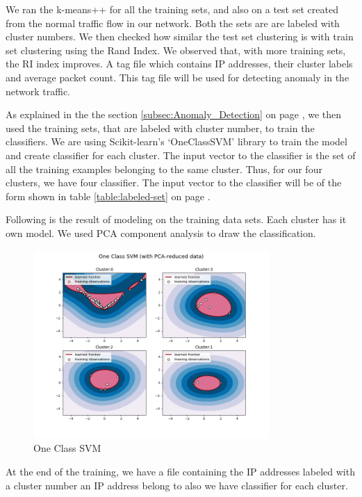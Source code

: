 \documentclass[12pt,oneside,a4paper]{article}
\begin{document}
We ran the k-means++ for all the training sets, and also on a test set created from the normal traffic flow in our network. Both the sets are are labeled with cluster numbers. We then checked how similar the test set clustering is with train set clustering using the Rand Index. We observed that, with more training sets, the RI index improves. A tag file which contains IP addresses, their cluster labels and average packet count. This tag file will be used for detecting anomaly in the network traffic.

As explained in the the section \ref{subsec:Anomaly_Detection} on page \pageref{subsec:Anomaly_Detection}, we then used the training sets, that are labeled with cluster number, to train the classifiers. We are using Scikit-learn's `OneClassSVM' library to train the model and create classifier for each cluster. The input vector to the classifier is the set of all the training examples belonging to the same cluster. Thus, for our four clusters, we have four classifier. The input vector to the classifier will be of the form shown in table \ref{table:labeled-set} on page \pageref{table:labeled-set}.

Following is the result of modeling on the training data sets. Each cluster has it own model. We used PCA component analysis to draw the classification.

\begin{figure}[H]
\centering
\includegraphics[width=0.80\textwidth]{one-class-SVM.png}
\caption{One Class SVM} \label{fig:one-class-SVM}
\end{figure}

At the end of the training, we have a file containing the IP addresses labeled with a cluster number an IP address belong to also we have classifier for each cluster.
\end{document}
